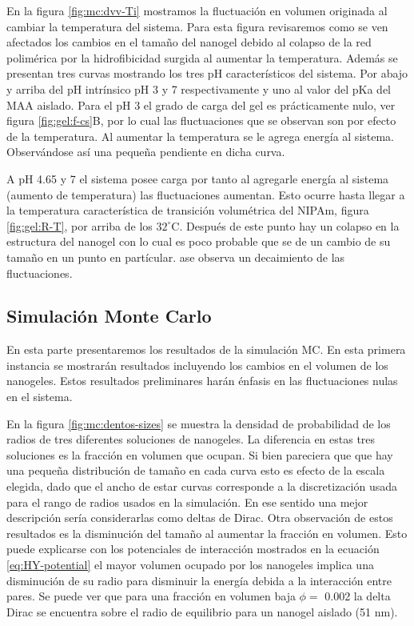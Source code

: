 En la figura \ref{fig:mc:dvv-Ti} mostramos la fluctuaci\'on en volumen originada al cambiar la temperatura del sistema. Para esta figura revisaremos como se ven afectados los cambios en el tama\~no del nanogel debido al colapso de la red polim\'erica por la hidrofibicidad surgida al aumentar la temperatura. Adem\'as se presentan tres curvas mostrando los tres pH caracter\'isticos del sistema. Por abajo y arriba del pH intr\'insico pH 3 y 7 respectivamente y uno al valor del pKa del MAA aislado.
Para el pH 3 el grado de carga del gel es pr\'acticamente nulo, ver figura \ref{fig:gel:f-cs}B, por lo cual las fluctuaciones que se observan son por efecto de la temperatura. Al aumentar la temperatura se le agrega energ\'ia al sistema. Observ\'andose as\'i una peque\~na pendiente en dicha curva.

A pH 4.65 y 7 el sistema posee carga por tanto al agregarle energ\'ia al sistema (aumento de temperatura) las fluctuaciones aumentan. Esto ocurre hasta llegar a la temperatura caracter\'istica de transici\'on volum\'etrica del NIPAm, figura \ref{fig:gel:R-T}, por arriba de los $32 ^\circ$C. Despu\'es de este punto hay un colapso en la estructura del nanogel con lo cual es poco probable que se de un cambio de su tama\~no en un punto en part\'icular. ase observa un decaimiento de las fluctuaciones. 

\subsection{Simulaci\'on Monte Carlo}


En esta parte presentaremos los resultados de la simulaci\'on MC. En esta primera instancia se mostrar\'an resultados incluyendo los cambios en el volumen de los nanogeles.
Estos resultados preliminares har\'an \'enfasis en las fluctuaciones nulas en el sistema.

En la figura \ref{fig:mc:dentos-sizes} se muestra la densidad de probabilidad de los radios de tres diferentes soluciones de nanogeles. La diferencia en estas tres soluciones es la fracci\'on en volumen que ocupan.  
Si bien pareciera que que hay una peque\~na distribuci\'on de tama\~no en cada curva esto es efecto de la escala elegida, dado que el ancho de estar curvas corresponde a la discretizaci\'on usada para el rango de radios usados en la simulaci\'on. 
En ese sentido una mejor descripci\'on ser\'ia considerarlas como deltas de Dirac. 
Otra observaci\'on de estos resultados es la disminuci\'on del tama\~no al aumentar la fracci\'on en volumen. Esto puede explicarse con los potenciales de interacci\'on mostrados en la ecuaci\'on \ref{eq:HY-potential} el mayor volumen ocupado por los nanogeles implica una disminuci\'on de su radio para disminuir la energ\'ia debida a la interacci\'on entre pares.
Se puede ver que para una fracci\'on en volumen baja $\phi =$ 0.002 la delta Dirac se encuentra sobre el radio de equilibrio para un nanogel aislado (51 nm).


